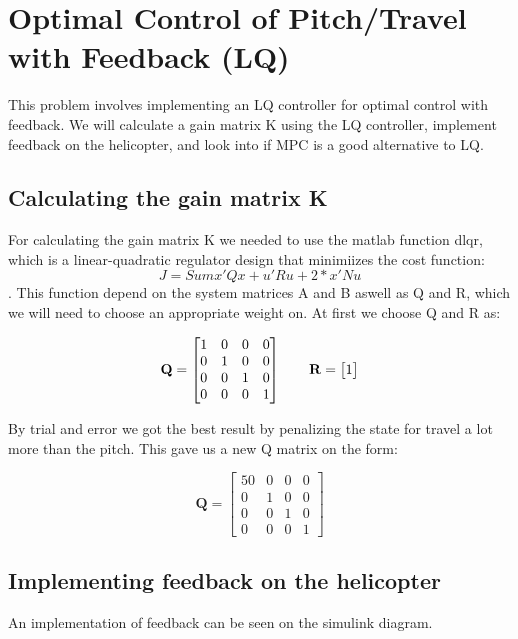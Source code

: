 \section{Optimal Control of Pitch/Travel with Feedback (LQ)}\label{sec:prob3}
This problem involves implementing an LQ controller for optimal control with feedback. We will calculate a gain matrix K using the LQ controller, implement feedback on the helicopter, and look into if MPC is a good alternative to LQ.

\subsection{Calculating the gain matrix K}
For calculating the gain matrix K we needed to use the matlab function dlqr, which is a linear-quadratic regulator design that minimiizes the cost function:
\begin{equation}
J = Sum {x'Qx + u'Ru + 2*x'Nu}
\end{equation}.
This function depend on the system matrices A and B aswell as Q and R, which we will need to choose an appropriate weight on. At first we choose Q and R as:

\begin{equation}
\mathbf{Q} =
\begin{bmatrix}
1 & 0 & 0 & 0 \\
0 & 1 & 0 & 0 \\
0 & 0 & 1 & 0 \\
0 & 0 & 0 & 1
\end{bmatrix}
\qquad\bold{R}=
\begin{bmatrix}
1
\end{bmatrix}
\end{equation}

 By trial and error we got the best result by penalizing the state for travel a lot more than the pitch. This gave us a new Q matrix on the form:

\begin{equation}
\mathbf{Q} =
\begin{bmatrix}
50 & 0 & 0 & 0 \\
0 & 1 & 0 & 0 \\
0 & 0 & 1 & 0 \\
0 & 0 & 0 & 1
\end{bmatrix}
\end{equation}

\subsection{Implementing feedback on the helicopter}
An implementation of feedback can be seen on the simulink diagram.

